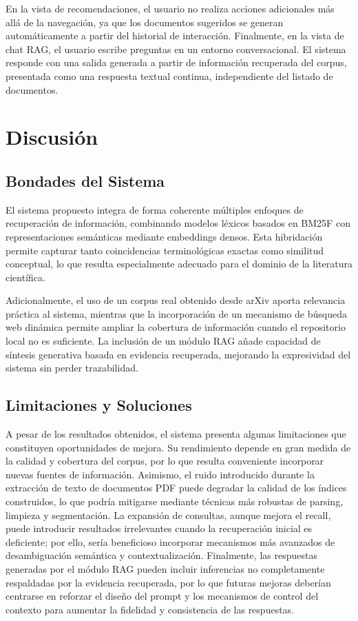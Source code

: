 \documentclass[runningheads]{llncs}
\begin{document}
En la vista de recomendaciones, el usuario no realiza acciones adicionales más allá de la navegación, 
ya que los documentos sugeridos se generan automáticamente a partir del historial de interacción. 
Finalmente, en la vista de chat RAG, el usuario escribe preguntas en un entorno conversacional. 
El sistema responde con una salida generada a partir de información recuperada del corpus, 
presentada como una respuesta textual continua, independiente del listado de documentos.

\section{Discusión}

\subsection{Bondades del Sistema}

El sistema propuesto integra de forma coherente múltiples enfoques de recuperación de información, 
combinando modelos léxicos basados en BM25F con representaciones semánticas mediante embeddings densos. 
Esta hibridación permite capturar tanto coincidencias terminológicas exactas como similitud conceptual, 
lo que resulta especialmente adecuado para el dominio de la literatura científica.

Adicionalmente, el uso de un corpus real obtenido desde arXiv aporta relevancia práctica al sistema, 
mientras que la incorporación de un mecanismo de búsqueda web dinámica permite ampliar la cobertura de información 
cuando el repositorio local no es suficiente. 
La inclusión de un módulo RAG añade capacidad de síntesis generativa basada en evidencia recuperada, 
mejorando la expresividad del sistema sin perder trazabilidad.

\subsection{Limitaciones y Soluciones}

A pesar de los resultados obtenidos, el sistema presenta algunas limitaciones que constituyen oportunidades de mejora. 
Su rendimiento depende en gran medida de la calidad y cobertura del corpus, por lo que resulta conveniente incorporar nuevas fuentes de información. 
Asimismo, el ruido introducido durante la extracción de texto de documentos PDF puede degradar la calidad de los índices construidos, 
lo que podría mitigarse mediante técnicas más robustas de parsing, limpieza y segmentación. 
La expansión de consultas, aunque mejora el recall, puede introducir resultados irrelevantes cuando la recuperación inicial es deficiente; 
por ello, sería beneficioso incorporar mecanismos más avanzados de desambiguación semántica y contextualización. 
Finalmente, las respuestas generadas por el módulo RAG pueden incluir inferencias no completamente respaldadas por la evidencia recuperada, 
por lo que futuras mejoras deberían centrarse en reforzar el diseño del prompt y los mecanismos de control del contexto para 
aumentar la fidelidad y consistencia de las respuestas.
\end{document}
